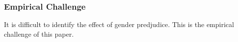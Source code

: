 \documentclass[10pt,letterpaper,subeqn]{beamer}
\begin{document}




\begin{frame}
  \frametitle{Empirical Challenge}
It is difficult to identify the effect of gender predjudice.  This is the empirical challenge of this paper. 

\end{frame}
\end{document}
